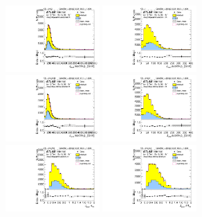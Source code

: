 \begin{figure}[htbp!]
\begin{center}
\includegraphics[width=0.32\textwidth,angle=-90]{figures/boosted/Sideband/b77_TwoTag_split_Sideband_leadHCand_trk0_Pt.pdf}
\includegraphics[width=0.32\textwidth,angle=-90]{figures/boosted/Sideband/b77_TwoTag_split_Sideband_leadHCand_trk1_Pt.pdf}\\
\includegraphics[width=0.32\textwidth,angle=-90]{figures/boosted/Sideband/b77_TwoTag_split_Sideband_sublHCand_trk0_Pt.pdf}
\includegraphics[width=0.32\textwidth,angle=-90]{figures/boosted/Sideband/b77_TwoTag_split_Sideband_sublHCand_trk1_Pt.pdf}\\
\includegraphics[width=0.32\textwidth,angle=-90]{figures/boosted/Sideband/b77_TwoTag_split_Sideband_leadHCand_trk_dr.pdf}
\includegraphics[width=0.32\textwidth,angle=-90]{figures/boosted/Sideband/b77_TwoTag_split_Sideband_sublHCand_trk_dr.pdf}

\end{center}
\end{figure}
